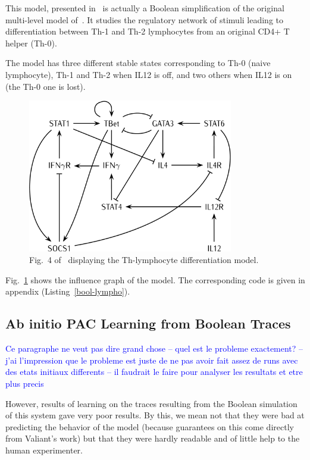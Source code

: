 \documentclass{llncs}
\newcommand{\francois}[1]{\textcolor{blue}{#1}}
\begin{document}
This model, presented in~\cite{RRMTC06tcsb} is actually a Boolean
simplification of the original multi-level model
of~\cite{Mendoza06biosystems}. It studies the regulatory network of stimuli
leading to differentiation between Th-1 and Th-2 lymphocytes from an original
CD4+ T helper (Th-0).

The model has three different stable states corresponding to Th-0 (naive
lymphocyte), Th-1 and Th-2 when IL12 is off, and two others when IL12 is on
(the Th-0 one is lost).

\begin{figure}[htbp]
   \centering
   \includegraphics[width=0.8\textwidth]{th_net_clean.png}
   \caption{Fig.~4 of~\cite{RRMTC06tcsb} displaying the Th-lymphocyte
   differentiation model.\label{fig:lympho}}
\end{figure}

Fig.~\ref{fig:lympho} shows the influence graph of the model. The
corresponding code is given in appendix (Listing~\ref{bool-lympho}).

\subsection{Ab initio PAC Learning from Boolean Traces}

\francois{Ce paragraphe ne veut pas dire grand chose --
quel est le probleme exactement?
-- j'ai l'impression que le probleme est juste de ne pas avoir fait assez de runs avec des etats initiaux differents
-- il faudrait le faire pour analyser les resultats et etre plus precis}

However, results of learning on the traces resulting from the Boolean simulation of this system gave very poor results. By this, we mean not that they were bad at predicting the behavior of the model (because guarantees on this come directly from Valiant's work) but that they were hardly readable and of little help to the human experimenter. 
\end{document}
